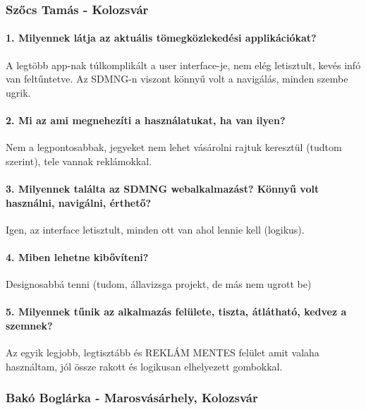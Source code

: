 \subsubsection{Szőcs Tamás - Kolozsvár}
\paragraph*{1. Milyennek látja az aktuális tömegközlekedési applikációkat?} 
A legtöbb app-nak túlkomplikált a user interface-je, nem elég letisztult, kevés infó van feltűntetve. Az SDMNG-n viszont könnyű volt a navigálás, minden szembe ugrik.

\paragraph*{2. Mi az ami megnehezíti a használatukat, ha van ilyen?} 
Nem a legpontosabbak, jegyeket nem lehet vásárolni rajtuk keresztül (tudtom szerint), tele vannak reklámokkal.

\paragraph*{3. Milyennek találta az SDMNG webalkalmazást? Könnyű volt használni, navigálni, érthető?} 
Igen, az interface letisztult, minden ott van ahol lennie kell (logikus).

\paragraph*{4. Miben lehetne kibővíteni?}
Designosabbá tenni (tudom, állavizsga projekt, de más nem ugrott be)

\paragraph*{5. Milyennek tűnik az alkalmazás felülete, tiszta, átlátható, kedvez a szemnek?}
Az egyik legjobb, legtisztább és REKLÁM MENTES felület amit valaha használtam, jól össze rakott és logikusan elhelyezett gombokkal.

\subsubsection{Bakó Boglárka - Marosvásárhely, Kolozsvár}

